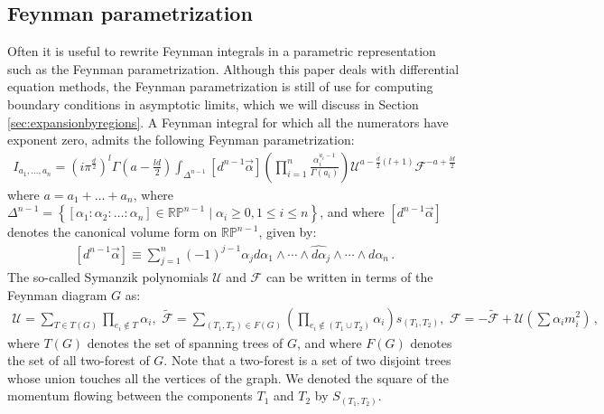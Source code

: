 \documentclass{article}
\begin{document}
\subsection{Feynman parametrization}
\label{sec:feynpar}
Often it is useful to rewrite Feynman integrals in a parametric representation such as the Feynman parametrization. Although this paper deals with differential equation methods, the Feynman parametrization is still of use for computing boundary conditions in asymptotic limits, which we will discuss in Section \ref{sec:expansionbyregions}. A Feynman integral for which all the numerators have exponent zero, admits the following Feynman parametrization:
\begin{align}
    \label{eq:feynpar}
    I_{a_1, \ldots, a_{n}}=\left(i \pi^{\frac{d}{2}}\right)^{l}\Gamma\left(a-\frac{l d}{2}\right)\int_{\Delta^{n-1}} [d^{n-1} \vec{\alpha}]   \left(\prod_{i=1}^{n} \frac{\alpha_{i}^{a_{i}-1}}{\Gamma(a_i)}\right) \mathcal{U}^{a-\frac{d}{2}(l+1)} \mathcal{F}^{-a+\frac{l d}{2}}
\end{align}
where $a = a_1 + \ldots + a_n$, where $\Delta^{n-1}=\left\{\left[\alpha_{1}: \alpha_{2}: \ldots: \alpha_{n}\right] \in \mathbb{R}\mathbb{P}^{n-1} \mid \alpha_{i} \geq 0,1 \leq i \leq n\right\}$, and where $[d^{n-1}\vec{\alpha}]$ denotes the canonical volume form on $\mathbb{R} \mathbb{P}^{n-1}$, given by:
\begin{align}
    \left[d^{n-1} \vec{\alpha}\right]\equiv \sum_{j=1}^{n}(-1)^{j-1} \alpha_{j} d \alpha_{1} \wedge \cdots \wedge \widehat{d \alpha}_{j} \wedge \cdots \wedge d \alpha_{n}\,.
\end{align}
The so-called Symanzik polynomials $\mathcal{U}$ and $\mathcal{F}$ can be written in terms of the Feynman diagram $G$ as:
\begin{align}
\label{eq:symanzikpols}
\mathcal{U}=\sum_{T \in T(G)} \prod_{e_{i} \notin T} \alpha_{i}, \,\, \tilde{\mathcal{F}}=\sum_{\left(T_{1}, T_{2}\right) \in F(G)}\left(\prod_{e_{i} \notin\left(T_{1} \cup T_{2}\right)} \alpha_{i}\right) s_{\left(T_{1}, T_{2}\right)}, \,\, \mathcal{F}=-\tilde{\mathcal{F}}+\mathcal{U}\left(\sum \alpha_{i} m_{i}^{2}\right)\,,
\end{align}
where $T(G)$ denotes the set of spanning trees of $G$, and where $F(G)$ denotes the set of all two-forest of $G$. Note that a two-forest is a set of two disjoint trees whose union touches all the vertices of the graph. We denoted the square of the momentum flowing between the components $T_1$ and $T_2$ by $S_{(T_1,T_2)}$.
\end{document}
